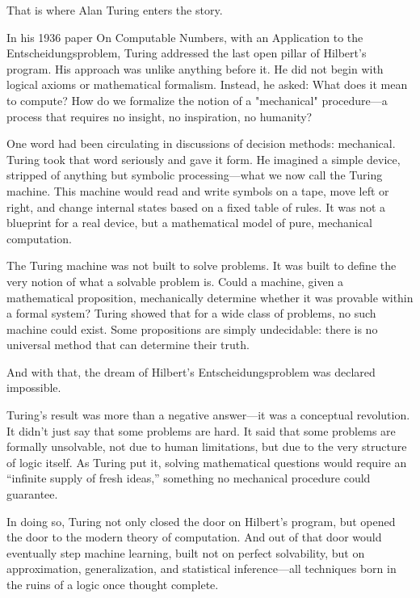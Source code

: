 That is where Alan Turing enters the story.

In his 1936 paper On Computable Numbers, with an Application to the Entscheidungsproblem, Turing addressed the last open pillar of Hilbert’s program. His approach was unlike anything before it. He did not begin with logical axioms or mathematical formalism. Instead, he asked: What does it mean to compute? How do we formalize the notion of a "mechanical" procedure—a process that requires no insight, no inspiration, no humanity?

One word had been circulating in discussions of decision methods: mechanical. Turing took that word seriously and gave it form. He imagined a simple device, stripped of anything but symbolic processing—what we now call the Turing machine. This machine would read and write symbols on a tape, move left or right, and change internal states based on a fixed table of rules. It was not a blueprint for a real device, but a mathematical model of pure, mechanical computation.

The Turing machine was not built to solve problems. It was built to define the very notion of what a solvable problem is. Could a machine, given a mathematical proposition, mechanically determine whether it was provable within a formal system? Turing showed that for a wide class of problems, no such machine could exist. Some propositions are simply undecidable: there is no universal method that can determine their truth.

And with that, the dream of Hilbert’s Entscheidungsproblem was declared impossible.

Turing's result was more than a negative answer—it was a conceptual revolution. It didn’t just say that some problems are hard. It said that some problems are formally unsolvable, not due to human limitations, but due to the very structure of logic itself. As Turing put it, solving mathematical questions would require an “infinite supply of fresh ideas,” something no mechanical procedure could guarantee.

In doing so, Turing not only closed the door on Hilbert’s program, but opened the door to the modern theory of computation. And out of that door would eventually step machine learning, built not on perfect solvability, but on approximation, generalization, and statistical inference—all techniques born in the ruins of a logic once thought complete.
